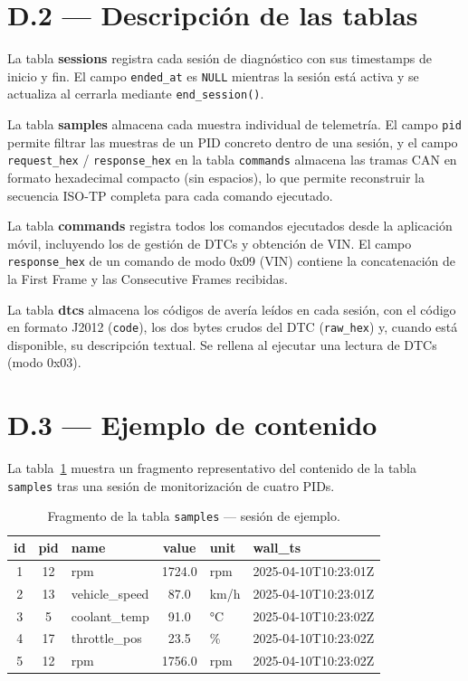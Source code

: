 \section*{D.2 — Descripción de las tablas}

La tabla \textbf{sessions} registra cada sesión de diagnóstico con sus timestamps de
inicio y fin. El campo \texttt{ended\_at} es \texttt{NULL} mientras la sesión está
activa y se actualiza al cerrarla mediante \texttt{end\_session()}.

La tabla \textbf{samples} almacena cada muestra individual de telemetría. El campo
\texttt{pid} permite filtrar las muestras de un PID concreto dentro de una sesión,
y el campo \texttt{request\_hex} / \texttt{response\_hex} en la tabla
\texttt{commands} almacena las tramas CAN en formato hexadecimal compacto (sin
espacios), lo que permite reconstruir la secuencia ISO-TP completa para cada
comando ejecutado.

La tabla \textbf{commands} registra todos los comandos ejecutados desde la aplicación
móvil, incluyendo los de gestión de DTCs y obtención de VIN. El campo
\texttt{response\_hex} de un comando de modo 0x09 (VIN) contiene la concatenación
de la First Frame y las Consecutive Frames recibidas.

La tabla \textbf{dtcs} almacena los códigos de avería leídos en cada sesión, con el
código en formato J2012 (\texttt{code}), los dos bytes crudos del DTC (\texttt{raw\_hex})
y, cuando está disponible, su descripción textual. Se rellena al ejecutar una lectura
de DTCs (modo 0x03).

\section*{D.3 — Ejemplo de contenido}

La tabla~\ref{tab:ejemplo_samples} muestra un fragmento representativo del contenido
de la tabla \texttt{samples} tras una sesión de monitorización de cuatro PIDs.

\begin{table}[!htbp]
\caption{Fragmento de la tabla \texttt{samples} — sesión de ejemplo.}
\label{tab:ejemplo_samples}
\centering
\renewcommand{\arraystretch}{1.2}
\begin{tabular}{|c|c|l|c|l|l|}
\hline
\textbf{id} & \textbf{pid} & \textbf{name} & \textbf{value} & \textbf{unit} & \textbf{wall\_ts} \\
\hline
1 & 12  & rpm            & 1724.0 & rpm  & 2025-04-10T10:23:01Z \\
2 & 13  & vehicle\_speed & 87.0   & km/h & 2025-04-10T10:23:01Z \\
3 & 5   & coolant\_temp  & 91.0   & °C   & 2025-04-10T10:23:02Z \\
4 & 17  & throttle\_pos  & 23.5   & \%   & 2025-04-10T10:23:02Z \\
5 & 12  & rpm            & 1756.0 & rpm  & 2025-04-10T10:23:02Z \\
\hline
\end{tabular}
\end{table}

